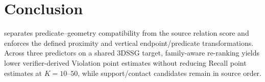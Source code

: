 \section{Conclusion}

\method{} separates predicate--geometry compatibility from the source relation
score and enforces the defined proximity and vertical endpoint/predicate
transformations. Across three predictors on a shared 3DSSG target, family-aware
re-ranking yields lower verifier-derived Violation point estimates without
reducing Recall point estimates at $K=10$--$50$, while support/contact candidates
remain in source order.
